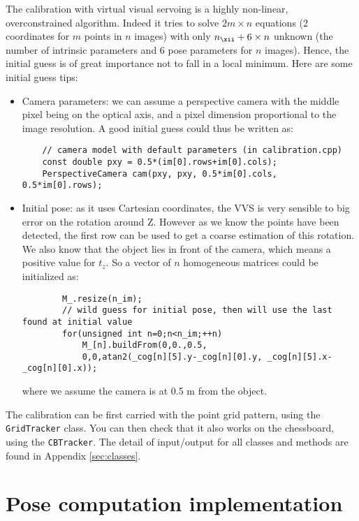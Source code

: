 \documentclass{ecnreport}
\begin{document}
The calibration with virtual visual servoing is a highly non-linear, overconstrained algorithm. Indeed it tries to solve $2m\times n$ equations (2 coordinates for $m$ points in $n$ images) with
only $n_\xii + 6\times n$ unknown (the number of intrinsic parameters and 6 pose parameters for $n$ images). Hence, the initial guess is of great importance
not to fall in a local minimum. Here are some initial guess tips:
\begin{itemize}
 \item Camera parameters: we can assume a perspective camera with the middle pixel being on the optical axis, and a pixel dimension proportional to the image resolution. 
 A good initial guess could thus be written as:
 \begin{center}\cppstyle
\begin{lstlisting}
    // camera model with default parameters (in calibration.cpp)
    const double pxy = 0.5*(im[0].rows+im[0].cols);
    PerspectiveCamera cam(pxy, pxy, 0.5*im[0].cols, 0.5*im[0].rows);
\end{lstlisting}
\end{center}
\item Initial pose: as it uses Cartesian coordinates, the VVS is very sensible to big error on the rotation around Z. However as we know the points have been detected, the first row can be used to 
get a coarse estimation of this rotation. We also know that the object lies in front of the camera, which means a positive value for $t_z$. So a vector of $n$ homogeneous matrices could be initialized as:
 \begin{center}\cppstyle
\begin{lstlisting}
        M_.resize(n_im);
        // wild guess for initial pose, then will use the last found at initial value
        for(unsigned int n=0;n<n_im;++n)
            M_[n].buildFrom(0,0.,0.5,
            0,0,atan2(_cog[n][5].y-_cog[n][0].y, _cog[n][5].x-_cog[n][0].x));
\end{lstlisting}
\end{center}where we assume the camera is at 0.5 m from the object.
\end{itemize}

The calibration can be first carried with the point grid pattern, using the \texttt{GridTracker} class. You can then check that it also works on the chessboard, 
using the \texttt{CBTracker}. The detail of input/output for all classes and methods are found in Appendix \ref{sec:classes}.


\section{Pose computation implementation}
\end{document}
